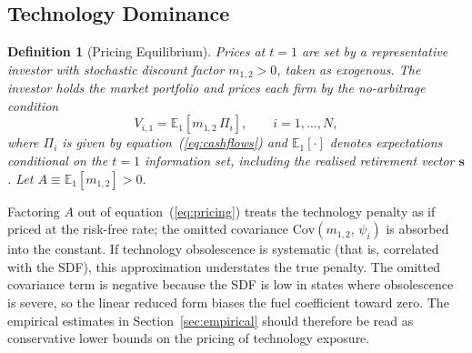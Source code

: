 \documentclass[12pt,a4paper]{article}
\newtheorem{definition}{Definition}
\newcommand{\E}{\mathbb{E}}
\begin{document}
\subsection{Technology Dominance}\label{sec:predictions}

\begin{definition}[Pricing Equilibrium]\label{def:equilibrium}
Prices at $t=1$ are set by a representative investor with stochastic discount factor $m_{1,2} > 0$, taken as exogenous. The investor holds the market portfolio and prices each firm by the no-arbitrage condition
\begin{equation}\label{eq:pricing}
V_{i,1} = \E_1[m_{1,2}\, \Pi_i], \qquad i = 1, \ldots, N,
\end{equation}
where $\Pi_i$ is given by equation~(\ref{eq:cashflows}) and $\E_1[\cdot]$ denotes expectations conditional on the $t=1$ information set, including the realised retirement vector $\mathbf{s}$. Let $A \equiv \E_1[m_{1,2}] > 0$.
\end{definition}

Factoring $A$ out of equation~(\ref{eq:pricing}) treats the technology penalty as if priced at the risk-free rate; the omitted covariance $\mathrm{Cov}(m_{1,2},\,\psi_i)$ is absorbed into the constant. If technology obsolescence is systematic (that is, correlated with the SDF), this approximation understates the true penalty. The omitted covariance term is negative because the SDF is low in states where obsolescence is severe, so the linear reduced form biases the fuel coefficient toward zero. The empirical estimates in Section~\ref{sec:empirical} should therefore be read as conservative lower bounds on the pricing of technology exposure.
\end{document}
